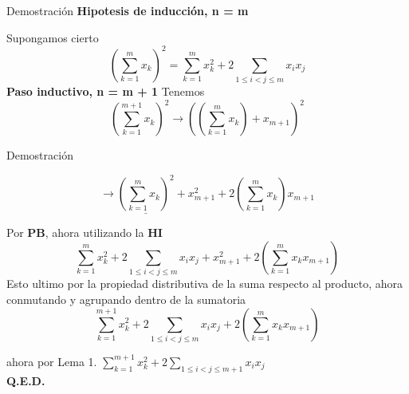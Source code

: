 \begin{frame}{Demostración}
\textbf{Hipotesis de inducción, n = m} 

Supongamos cierto 
\begin{equation}
    (\sum_{k=1}^{m} x_{k})^{2} = \sum_{k=1}^{m} x_{k}^{2} + 2 \sum_{1 \leq i<j \leq m}x_{i}x_{j}
\end{equation}
\textbf{Paso inductivo, n = m + 1}  
Tenemos
\begin{equation}
    (\sum_{k=1}^{m+1} x_{k})^{2} \to ((\sum_{k=1}^{m} x_{k})+x_{m+1})^{2} 
\end{equation}
\end{frame}


\begin{frame}{Demostración}

\begin{equation}
    \to  \underline{(\sum_{k=1}^{m} x_{k})^{2}}+x_{m+1}^{2}+2(\sum_{k=1}^{m} x_{k})x_{m+1}
\end{equation}

Por \textbf{PB}, ahora utilizando la \textbf{HI}
\begin{equation}
    \sum_{k=1}^{m} x_{k}^{2} + 2 \sum_{1 \leq i<j \leq m}x_{i}x_{j}+x_{m+1}^{2}+2(\sum_{k=1}^{m} x_{k}x_{m+1})
\end{equation}
Esto ultimo por la propiedad distributiva de la suma respecto al producto, ahora conmutando y agrupando dentro de la 
sumatoria 
\begin{equation}
    \sum_{k=1}^{m+1} x_{k}^{2} + 2 \sum_{1 \leq i<j \leq m}x_{i}x_{j} + 2(\sum_{k=1}^{m} x_{k}x_{m+1})
\end{equation}

ahora por Lema 1.
$\sum_{k=1}^{m+1} x_{k}^{2} + 2 \sum_{1 \leq i<j \leq m+1}x_{i}x_{j}$\\
\textbf{Q.E.D.}
\end{frame}
